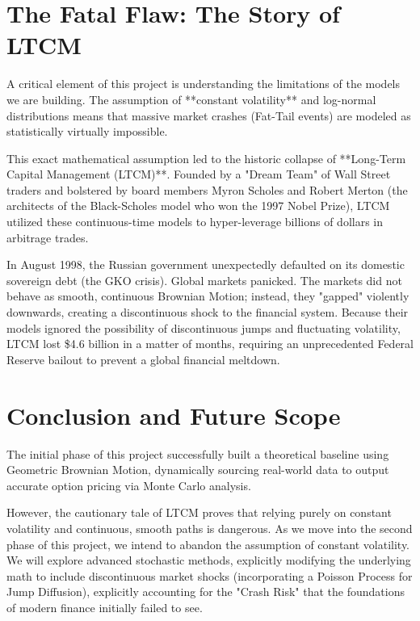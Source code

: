 \documentclass[12pt, a4paper]{article}
\begin{document}
\section{The Fatal Flaw: The Story of LTCM}
A critical element of this project is understanding the limitations of the models we are building. The assumption of **constant volatility** and log-normal distributions means that massive market crashes (Fat-Tail events) are modeled as statistically virtually impossible.

This exact mathematical assumption led to the historic collapse of **Long-Term Capital Management (LTCM)**. Founded by a "Dream Team" of Wall Street traders and bolstered by board members Myron Scholes and Robert Merton (the architects of the Black-Scholes model who won the 1997 Nobel Prize), LTCM utilized these continuous-time models to hyper-leverage billions of dollars in arbitrage trades.

In August 1998, the Russian government unexpectedly defaulted on its domestic sovereign debt (the GKO crisis). Global markets panicked. The markets did not behave as smooth, continuous Brownian Motion; instead, they "gapped" violently downwards, creating a discontinuous shock to the financial system. Because their models ignored the possibility of discontinuous jumps and fluctuating volatility, LTCM lost \$4.6 billion in a matter of months, requiring an unprecedented Federal Reserve bailout to prevent a global financial meltdown.

\section{Conclusion and Future Scope}
The initial phase of this project successfully built a theoretical baseline using Geometric Brownian Motion, dynamically sourcing real-world data to output accurate option pricing via Monte Carlo analysis.

However, the cautionary tale of LTCM proves that relying purely on constant volatility and continuous, smooth paths is dangerous. As we move into the second phase of this project, we intend to abandon the assumption of constant volatility. We will explore advanced stochastic methods, explicitly modifying the underlying math to include discontinuous market shocks (incorporating a Poisson Process for Jump Diffusion), explicitly accounting for the "Crash Risk" that the foundations of modern finance initially failed to see.
\end{document}

